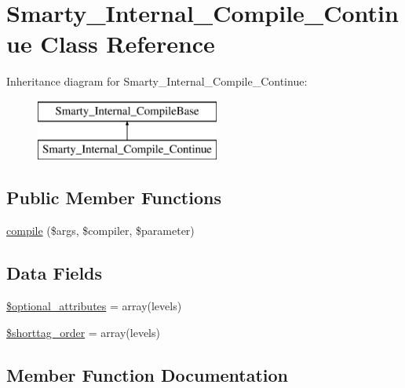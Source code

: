 \hypertarget{class_smarty___internal___compile___continue}{}\section{Smarty\+\_\+\+Internal\+\_\+\+Compile\+\_\+\+Continue Class Reference}
\label{class_smarty___internal___compile___continue}
Inheritance diagram for Smarty\+\_\+\+Internal\+\_\+\+Compile\+\_\+\+Continue\+:\begin{figure}[H]
\begin{center}
\leavevmode
\includegraphics[height=2.000000cm]{class_smarty___internal___compile___continue}
\end{center}
\end{figure}
\subsection*{Public Member Functions}
\begin{DoxyCompactItemize}
\item 
\hyperlink{class_smarty___internal___compile___continue_a84998958b9fc8c11c2ebe9620a49b853}{compile} (\$args, \$compiler, \$parameter)
\end{DoxyCompactItemize}
\subsection*{Data Fields}
\begin{DoxyCompactItemize}
\item 
\hyperlink{class_smarty___internal___compile___continue_a899d1eb4a6fecbd6ce696adb171c80a4}{\$optional\+\_\+attributes} = array(\textquotesingle{}levels\textquotesingle{})
\item 
\hyperlink{class_smarty___internal___compile___continue_a2ccb25269c3a92e8c4796c7ef23725e6}{\$shorttag\+\_\+order} = array(\textquotesingle{}levels\textquotesingle{})
\end{DoxyCompactItemize}


\subsection{Member Function Documentation}
\hypertarget{class_smarty___internal___compile___continue_a84998958b9fc8c11c2ebe9620a49b853}{}
